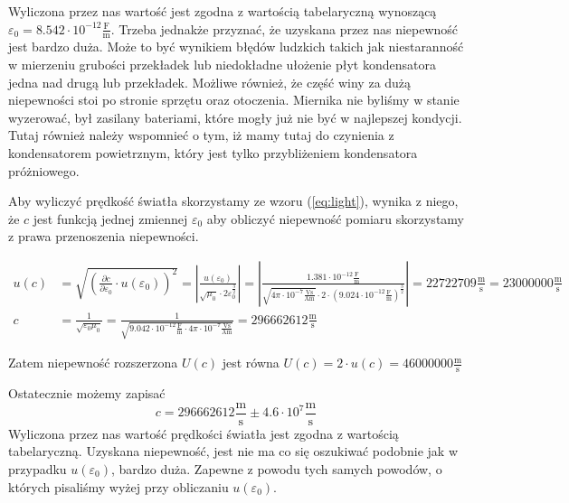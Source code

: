 \documentclass{fizykalab}
\newcommand{\Fm}{\ensuremath{\frac{\text{F}}{\text{m}}}}
\begin{document}
Wyliczona przez nas wartość jest zgodna z wartością tabelaryczną wynoszącą
$\varepsilon_0 = 8.542 \cdot 10^{-12} \Fm $. Trzeba jednakże przyznać, że
uzyskana przez nas niepewność jest bardzo duża. Może to być wynikiem
błędów ludzkich takich jak niestaranność w mierzeniu grubości przekładek
lub niedokładne ułożenie płyt
kondensatora jedna nad drugą lub przekładek.
Możliwe również, że część winy za dużą niepewności stoi po 
stronie sprzętu oraz otoczenia.
Miernika nie byliśmy w stanie wyzerować, był
zasilany bateriami, które mogły już nie być 
w najlepszej kondycji. Tutaj również należy 
wspomnieć o tym, iż mamy  tutaj do czynienia
z kondensatorem powietrznym, który jest
tylko przybliżeniem kondensatora próżniowego.

Aby wyliczyć prędkość światła skorzystamy ze wzoru (\ref{eq:light}), 
wynika z niego, że $c$ jest funkcją jednej zmiennej $\varepsilon_0$
aby obliczyć niepewność pomiaru skorzystamy z prawa przenoszenia niepewności.

\begin{align*}
    u(c) &= \sqrt{ \left( \frac{\partial c}{\partial \varepsilon_0}
                         \cdot u(\varepsilon_0) \right)^2}
    = \left| \frac{u(\varepsilon_0)}{\sqrt{\mu_0} \cdot 2\varepsilon_0^{\frac{3}{2}}} \right| 
    = \left| \frac{1.381 \cdot 10^{-12} \Fm}
    {
    \sqrt{4\pi \cdot 10^{-7} \frac{\text{Vs}}{\text{Am}}}
    \cdot
    2 \cdot \left(  9.024 \cdot 10^{-12} \Fm \right)^ {\frac{3}{2}}
    }  \right| = 22722709 \frac{\text{m}}{\text{s}} = 23000000 \frac{\text{m}}{\text{s}} \\
    c &= \frac{1}{\sqrt{\varepsilon_0 \mu_0}} = 
    \frac{1}{\sqrt{9.042 \cdot 10^{-12} \Fm \cdot 4 \pi \cdot 10^{-7} \frac{\text{Vs}}{\text{Am}}} } = 
    296662612\frac{\text{m}}{\text{s}}
\end{align*}

Zatem niepewność rozszerzona $U(c)$ jest równa 
$U(c) = 2\cdot u(c) = 46 000 000 \frac{\text{m}}{\text{s}}$ 

Ostatecznie możemy zapisać
\begin{equation*}
    c = 296662612\frac{\text{m}}{\text{s}} \pm 4.6 \cdot 10^7 \frac{\text{m}}{\text{s}}
\end{equation*}
Wyliczona przez nas wartość prędkości światła jest zgodna z wartością tabelaryczną.
Uzyskana niepewność, jest nie ma co się oszukiwać podobnie jak w przypadku $u(\varepsilon_0)$,
bardzo duża. Zapewne z powodu tych samych powodów, o których pisaliśmy 
wyżej przy obliczaniu $u(\varepsilon_0)$.
\end{document}
